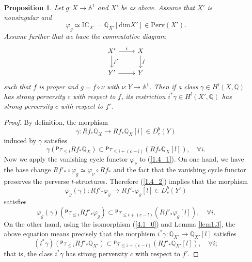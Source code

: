 \documentclass[11pt]{amsart}
\theoremstyle{plain}
\newtheorem{prop}[thm]{Proposition}
\theoremstyle{definition}
\theoremstyle{remark}
\newcommand{\BA}{{\mathbb{A}}}
\newcommand{\BQ}{{\mathbb{Q}}}
\begin{document}
\begin{prop}\label{prop1.4}
Let $g: X \to \BA^1$ and $X'$ be as above. Assume that $X'$ is nonsingular and
\begin{equation}\label{4.1_0}
\varphi_g \simeq \mathrm{IC}_{X'} = \BQ_{X'}[\mathrm{dim}X'] \in \mathrm{Perv}(X').
\end{equation}
Assume further that we have the commutative diagram
\begin{equation*}
\begin{tikzcd}
X' \arrow[r, "i"] \arrow[d, "f'"]
& X \arrow[d, "f"] \\
Y' \arrow[r]
& Y
\end{tikzcd}
\end{equation*}
such that $f$ is proper and $g =   f\circ \nu$ with $\nu: Y \to \BA^1$. Then if a class $\gamma \in H^l(X, \BQ)$ has strong perversity $c$ with respect to $f$, its restriction $i^*\gamma \in H^l(X', \BQ)$ has strong perversity $c$ with respect to $f'$. 
\end{prop}


\begin{proof}
By definition, the morphism 
\begin{equation}\label{1.4_1}
\gamma: Rf_* \BQ_X \to Rf_* \BQ_X[l] \in D^b_c(Y)
\end{equation}
induced by $\gamma$ satisfies
\begin{equation}\label{1.4_2}
\gamma \left({^\mathbf{p}\tau_{\leq i} Rf_* \BQ_X}\right) \subset {^\mathbf{p}\tau_{\leq i+(c-l)}} (Rf_* \BQ_X[l]), \quad \forall i.
\end{equation}
Now we apply the vanishing cycle functor $\varphi_\nu$ to (\ref{1.4_1}). On one hand, we have the base change $Rf'_* \circ \varphi_g \simeq \varphi_\nu\circ Rf_*$ and the fact that the vanishing cycle functor preserves the perverse $t$-structures. Therefore (\ref{1.4_2}) implies  that the morphism
\[
\varphi_g(\gamma): Rf'_* \varphi_g \to Rf'_* \varphi_g[l] \in D^b_c(Y')
\]
satisfies
\[
\varphi_g(\gamma) \left({^\mathbf{p}\tau_{\leq i}} Rf'_* \varphi_g\right) \subset {^\mathbf{p}\tau_{\leq i+(c-l)}} (Rf'_* \varphi_g[l]), \quad \forall i.
\]
On the other hand, using the isomorphism (\ref{4.1_0}) and Lemma \ref{lem1.3}, the above equation means precisely that the morphism $i^*\gamma : \BQ_{X'} \to \BQ_{X'}[l]$ satisfies
\begin{equation*}
(i^*\gamma) \left({^\mathbf{p}\tau_{\leq i} Rf'_* \BQ_{X'}}\right) \subset {^\mathbf{p}\tau_{\leq i+(c-l)}} (Rf'_* \BQ_{X'}[l]), \quad \forall i;
\end{equation*}
that is, the class $i^*\gamma$ has strong perversity $c$ with respect to $f'$.
\end{proof}
\end{document}
